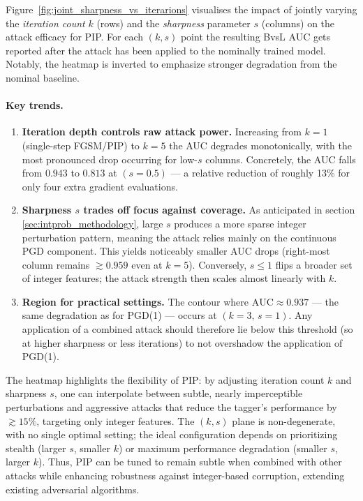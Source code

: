 Figure~\ref{fig:joint_sharpness_vs_iterarions} visualises the impact of jointly varying the \emph{iteration count} $k$ (rows) and the \emph{sharpness} parameter $s$ (columns) on the attack efficacy for PIP. For each $(k,s)$ point the resulting BvsL AUC gets reported after the attack has been applied to the nominally trained model. Notably, the heatmap is inverted to emphasize stronger degradation from the nominal baseline.

\paragraph{Key trends.}
\begin{enumerate}
  \item \textbf{Iteration depth controls raw attack power.}  
        Increasing from $k=1$ (single-step FGSM/PIP) to $k=5$ the AUC degrades monotonically, with the most pronounced drop occurring for low-$s$ columns.  Concretely, the AUC falls from $0.943$ to $0.813$ at
        $(s{=}0.5)$ — a relative reduction of roughly 13\% for only four extra gradient evaluations.
  \item \textbf{Sharpness $s$ trades off focus against coverage.}
        As anticipated in section \ref{sec:intprob_methodology}, large $s$ produces a more sparse integer perturbation pattern, meaning the attack relies mainly on the continuous PGD component. This yields noticeably smaller AUC drops (right-most column remains ${\gtrsim}0.959$ even at $k{=}5$).
        Conversely, $s\!\le\!1$ flips a broader set of integer features; the
        attack strength then scales almost linearly with $k$.
  \item \textbf{Region for practical settings.}  
        The contour where $\text{AUC}\!\approx\!0.937$ — the same degradation as for PGD(1) — occurs at $(k{=}3,\,s{=}1)$. Any application of a combined attack should therefore lie below this threshold (so at higher sharpness or less iterations) to not overshadow the application of PGD(1).
\end{enumerate}

The heatmap highlights the flexibility of PIP: by adjusting iteration count $k$ and sharpness $s$, one can interpolate between subtle, nearly imperceptible perturbations and aggressive attacks that reduce the tagger’s performance by $\gtrsim15\%$, targeting only integer features. The $(k,s)$ plane is non-degenerate, with no single optimal setting; the ideal configuration depends on prioritizing stealth (larger $s$, smaller $k$) or maximum performance degradation (smaller $s$, larger $k$). Thus, PIP can be tuned to remain subtle when combined with other attacks while enhancing robustness against integer-based corruption, extending existing adversarial algorithms.

